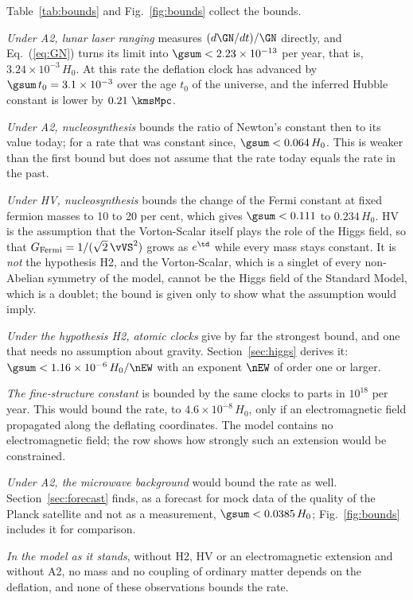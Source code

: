 Table~\ref{tab:bounds} and Fig.~\ref{fig:bounds} collect the bounds.

\emph{Under A2, lunar laser ranging} measures $(d\GN/dt)/\GN$ directly, and Eq.~(\ref{eq:GN}) turns
its limit into $\gsum<2.23\times10^{-13}$ per year, that is, $3.24\times10^{-3}\,H_0$. At this rate
the deflation clock has advanced by $\gsum\,t_0=3.1\times10^{-3}$ over the age $t_0$ of the universe,
and the inferred Hubble constant is lower by $0.21~\kmsMpc$.

\emph{Under A2, nucleosynthesis} bounds the ratio of Newton's constant then to its value today; for
a rate that was constant since, $\gsum<0.064\,H_0$. This is weaker than the first bound but does not
assume that the rate today equals the rate in the past.

\emph{Under HV, nucleosynthesis} bounds the change of the Fermi constant at fixed fermion masses to
10 to 20 per cent, which gives $\gsum<0.111$ to $0.234\,H_0$. HV is the assumption that the
Vorton-Scalar itself plays the role of the Higgs field, so that
$G_{\mathrm{Fermi}}=1/(\sqrt2\,\vVS^{2})$ grows as $e^{\td}$ while every mass stays constant. It is
\emph{not} the hypothesis H2, and the Vorton-Scalar, which is a singlet of every non-Abelian
symmetry of the model, cannot be the Higgs field of the Standard Model, which is a doublet; the bound
is given only to show what the assumption would imply.

\emph{Under the hypothesis H2, atomic clocks} give by far the strongest bound, and one that needs no
assumption about gravity. Section~\ref{sec:higgs} derives it: $\gsum<1.16\times10^{-6}\,H_0/\nEW$
with an exponent $\nEW$ of order one or larger.

\emph{The fine-structure constant} is bounded by the same clocks to parts in $10^{18}$ per year.
This would bound the rate, to $4.6\times10^{-8}\,H_0$, only if an electromagnetic field propagated
along the deflating coordinates. The model contains no electromagnetic field; the row shows how
strongly such an extension would be constrained.

\emph{Under A2, the microwave background} would bound the rate as well. Section~\ref{sec:forecast}
finds, as a forecast for mock data of the quality of the Planck satellite and not as a measurement,
$\gsum<0.0385\,H_0$; Fig.~\ref{fig:bounds} includes it for comparison.

\emph{In the model as it stands}, without H2, HV or an electromagnetic extension and without A2, no
mass and no coupling of ordinary matter depends on the deflation, and none of these observations
bounds the rate.

